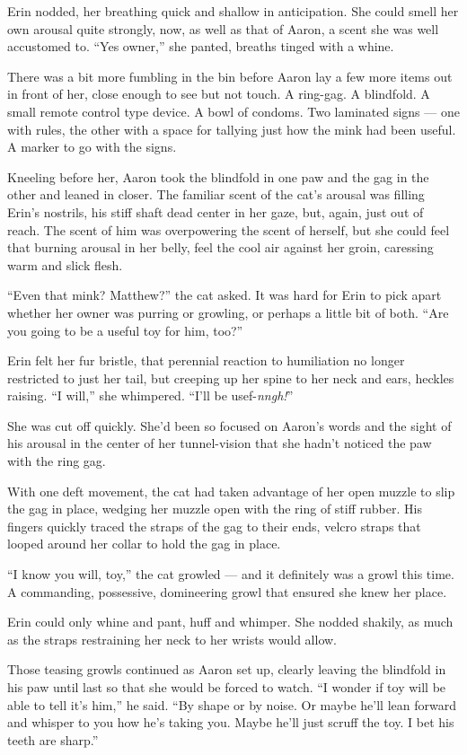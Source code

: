 Erin nodded, her breathing quick and shallow in anticipation. She could smell her own arousal quite strongly, now, as well as that of Aaron, a scent she was well accustomed to. ``Yes owner,'' she panted, breaths tinged with a whine.

There was a bit more fumbling in the bin before Aaron lay a few more items out in front of her, close enough to see but not touch. A ring-gag. A blindfold. A small remote control type device. A bowl of condoms. Two laminated signs --- one with rules, the other with a space for tallying just how the mink had been useful. A marker to go with the signs.

Kneeling before her, Aaron took the blindfold in one paw and the gag in the other and leaned in closer. The familiar scent of the cat's arousal was filling Erin's nostrils, his stiff shaft dead center in her gaze, but, again, just out of reach. The scent of him was overpowering the scent of herself, but she could feel that burning arousal in her belly, feel the cool air against her groin, caressing warm and slick flesh.

``Even that mink? Matthew?'' the cat asked. It was hard for Erin to pick apart whether her owner was purring or growling, or perhaps a little bit of both. ``Are you going to be a useful toy for him, too?''

Erin felt her fur bristle, that perennial reaction to humiliation no longer restricted to just her tail, but creeping up her spine to her neck and ears, heckles raising. ``I will,'' she whimpered. ``I'll be usef-\emph{nngh!}''

She was cut off quickly. She'd been so focused on Aaron's words and the sight of his arousal in the center of her tunnel-vision that she hadn't noticed the paw with the ring gag.

With one deft movement, the cat had taken advantage of her open muzzle to slip the gag in place, wedging her muzzle open with the ring of stiff rubber. His fingers quickly traced the straps of the gag to their ends, velcro straps that looped around her collar to hold the gag in place.

``I know you will, toy,'' the cat growled --- and it definitely was a growl this time. A commanding, possessive, domineering growl that ensured she knew her place.

Erin could only whine and pant, huff and whimper. She nodded shakily, as much as the straps restraining her neck to her wrists would allow.

Those teasing growls continued as Aaron set up, clearly leaving the blindfold in his paw until last so that she would be forced to watch. ``I wonder if toy will be able to tell it's him,'' he said. ``By shape or by noise. Or maybe he'll lean forward and whisper to you how he's taking you. Maybe he'll just scruff the toy. I bet his teeth are sharp.''

